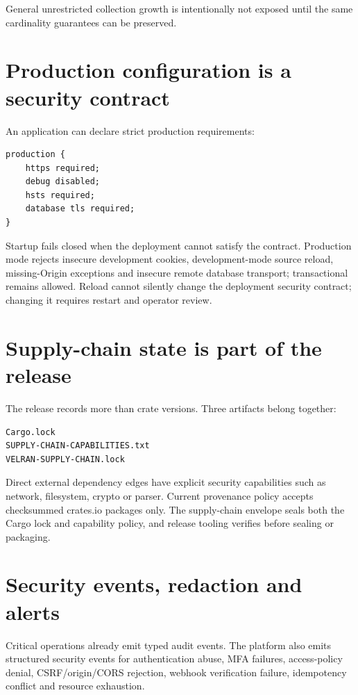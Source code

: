 General unrestricted collection growth is intentionally not exposed until the same cardinality guarantees can be preserved.

\section{Production configuration is a security contract}

An application can declare strict production requirements:

\begin{lstlisting}[language=Velran]
production {
    https required;
    debug disabled;
    hsts required;
    database tls required;
}
\end{lstlisting}

Startup fails closed when the deployment cannot satisfy the contract. Production mode rejects insecure development cookies, development-mode source reload, missing-Origin exceptions and insecure remote database transport; transactional  remains allowed. Reload cannot silently change the deployment security contract; changing it requires restart and operator review.

\section{Supply-chain state is part of the release}

The release records more than crate versions. Three artifacts belong together:

\begin{lstlisting}
Cargo.lock
SUPPLY-CHAIN-CAPABILITIES.txt
VELRAN-SUPPLY-CHAIN.lock
\end{lstlisting}

Direct external dependency edges have explicit security capabilities such as network, filesystem, crypto or parser. Current provenance policy accepts checksummed crates.io packages only. The supply-chain envelope seals both the Cargo lock and capability policy, and release tooling verifies  before sealing or packaging.

\section{Security events, redaction and alerts}

Critical operations already emit typed audit events. The platform also emits structured security events for authentication abuse, MFA failures, access-policy denial, CSRF/origin/CORS rejection, webhook verification failure, idempotency conflict and resource exhaustion.

